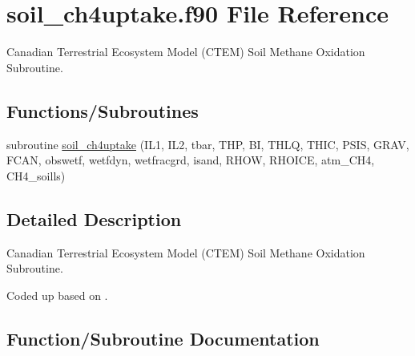 \hypertarget{soil__ch4uptake_8f90}{}\section{soil\+\_\+ch4uptake.\+f90 File Reference}
\label{soil__ch4uptake_8f90}


Canadian Terrestrial Ecosystem Model (C\+T\+E\+M) Soil Methane Oxidation Subroutine.  


\subsection*{Functions/\+Subroutines}
\begin{DoxyCompactItemize}
\item 
subroutine \hyperlink{soil__ch4uptake_8f90_a6224a4d6e29f37e3d26f6eceeee72372}{soil\+\_\+ch4uptake} (I\+L1, I\+L2, tbar, T\+H\+P, B\+I, T\+H\+L\+Q, T\+H\+I\+C, P\+S\+I\+S, G\+R\+A\+V, F\+C\+A\+N, obswetf, wetfdyn, wetfracgrd, isand, R\+H\+O\+W, R\+H\+O\+I\+C\+E, atm\+\_\+\+C\+H4, C\+H4\+\_\+soills)
\end{DoxyCompactItemize}


\subsection{Detailed Description}
Canadian Terrestrial Ecosystem Model (C\+T\+E\+M) Soil Methane Oxidation Subroutine. 

Coded up based on \cite{Curry2007-du}. 

\subsection{Function/\+Subroutine Documentation}
\hypertarget{soil__ch4uptake_8f90_a6224a4d6e29f37e3d26f6eceeee72372}{}
